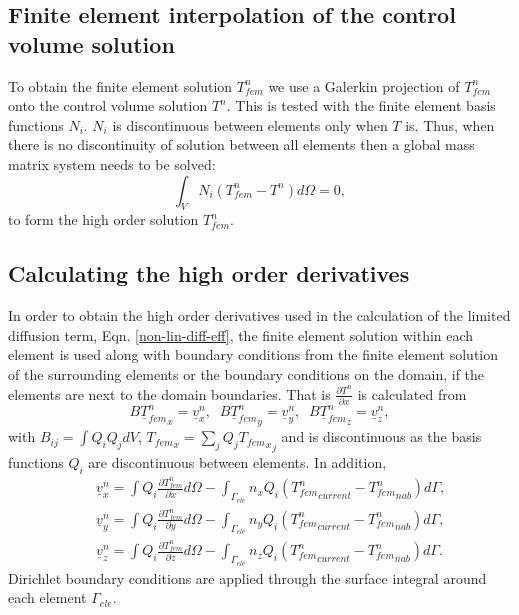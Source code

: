 \subsection{Finite element interpolation of the control volume solution}
To obtain the finite element solution $T_{fem}^n$ we use a Galerkin projection of $T_{fem}^n$ onto the control volume solution $T^n$. This is tested with the finite element basis functions $N_i$. $N_i$ is discontinuous between elements only when $T$ is. Thus, when there is no discontinuity of solution between all elements then a global mass matrix system needs to be solved:
 \begin{displaymath}
 \int_V N_i (T_{fem}^n- T^n) d\Omega =0,
\end{displaymath}
to form the high order solution $T_{fem}^n$.


\subsection{Calculating the high order derivatives}

In order to obtain the high order derivatives used in the calculation of the limited diffusion term, Eqn. \ref{non-lin-diff-eff}, the finite element solution within each element is used along with boundary conditions from the finite element solution of the surrounding elements or the boundary conditions on the domain, if the elements are next to the domain boundaries.
That is $\frac{\partial T^n}{\partial x}$ is calculated from
 \begin{equation}
 B {\underline T_{fem}^n}_x = \underline v_x^n, \;\;
 B {\underline T_{fem}^n}_y = \underline v_y^n, \;\;
 B {\underline T_{fem}^n}_z = \underline v_z^n,
\label{form-derivs}
\end{equation}
with $B_{ij}=\int Q_i Q_j dV$, ${T_{fem}}_x=\sum_j Q_j {{T_{fem}}_x}_j$ and is discontinuous as the basis functions $Q_i$ are discontinuous between elements. In addition,
 \begin{eqnarray}
&& \underline v_x^n=\int Q_{i} \frac{\partial T_{fem}^n}{\partial x} d\Omega
-\int_{\Gamma_{ele}} n_x Q_i ({T_{fem}^n}_{current}-{T_{fem}^n}_{nab})d\Gamma, \nonumber \\
&& \underline v_y^n=\int Q_{i} \frac{\partial T_{fem}^n}{\partial y} d\Omega
-\int_{\Gamma_{ele}} n_y Q_i ({T_{fem}^n}_{current}-{T_{fem}^n}_{nab})d\Gamma, \nonumber \\
&& \underline v_z^n=\int Q_{i} \frac{\partial T_{fem}^n}{\partial z} d\Omega
-\int_{\Gamma_{ele}} n_z Q_i ({T_{fem}^n}_{current}-{T_{fem}^n}_{nab})d\Gamma.
\end{eqnarray}
Dirichlet boundary conditions are applied through the surface integral around each element ${\Gamma_{ele}}$.

